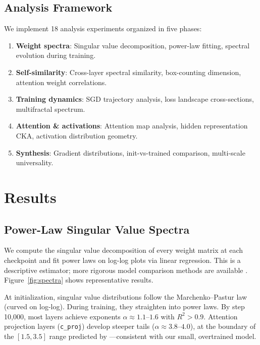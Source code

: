 \documentclass[11pt,a4paper]{article}
\begin{document}
\subsection{Analysis Framework}

We implement 18 analysis experiments organized in five phases:

\begin{enumerate}[leftmargin=*]
    \item \textbf{Weight spectra}: Singular value decomposition, power-law fitting, spectral evolution during training.
    \item \textbf{Self-similarity}: Cross-layer spectral similarity, box-counting dimension, attention weight correlations.
    \item \textbf{Training dynamics}: SGD trajectory analysis, loss landscape cross-sections, multifractal spectrum.
    \item \textbf{Attention \& activations}: Attention map analysis, hidden representation CKA, activation distribution geometry.
    \item \textbf{Synthesis}: Gradient distributions, init-vs-trained comparison, multi-scale universality.
\end{enumerate}

\section{Results}

\subsection{Power-Law Singular Value Spectra}

We compute the singular value decomposition of every weight matrix at each checkpoint and fit power laws on log-log plots via linear regression. This is a descriptive estimator; more rigorous model comparison methods are available \citep{clauset2009powerlaw, alstott2014powerlaw}. Figure~\ref{fig:spectra} shows representative results.

At initialization, singular value distributions follow the Marchenko--Pastur law (curved on log-log). During training, they straighten into power laws. By step 10,000, most layers achieve exponents $\alpha \approx 1.1$--$1.6$ with $R^2 > 0.9$. Attention projection layers (\texttt{c\_proj}) develop steeper tails ($\alpha \approx 3.8$--$4.0$), at the boundary of the $[1.5, 3.5]$ range predicted by \citet{martin2021predicting}---consistent with our small, overtrained model.
\end{document}
